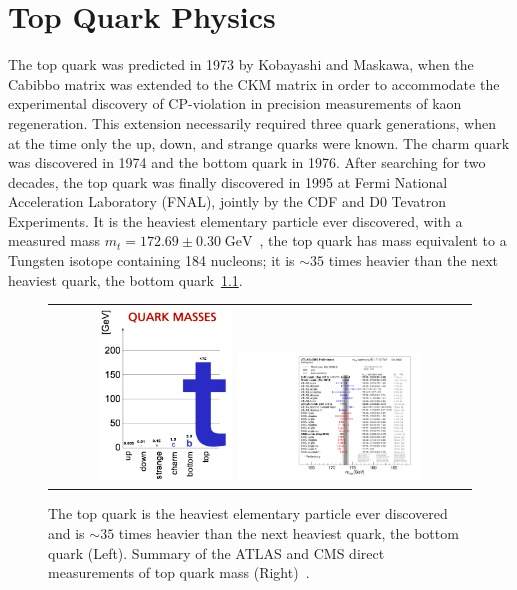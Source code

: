 
\chapter{Top Quark Physics}
The top quark was predicted in 1973 by Kobayashi and Maskawa, when the Cabibbo matrix was extended to the CKM matrix in order to accommodate the experimental discovery of CP-violation in precision measurements of kaon regeneration.
This extension necessarily required three quark generations, when at the time only the up, down, and strange quarks were known.
The charm quark was discovered in 1974 and the bottom quark in 1976.
After searching for two decades, the top quark was finally discovered in 1995 at Fermi National Acceleration Laboratory (FNAL), jointly by the CDF and D0 Tevatron Experiments.
It is the heaviest elementary particle ever discovered, with a measured mass $m_t = 172.69 \pm 0.30 \; \si{\GeV}$~\cite{bib:PDG}, the top quark has mass equivalent to a Tungsten isotope containing 184 nucleons; it is $\sim 35$ times heavier than the next heaviest quark, the bottom quark~\ref{QuarkMasses}.
\begin{figure}[!h]
  \begin{center}
    \begin{tabular}{c}
        \includegraphics[width=0.325\textwidth]{fig_TopQuark/TopQuarkMass.png}
        \includegraphics[width=0.45\textwidth]{fig_TopQuark/LHC_topmass_oct22.pdf}
    \end{tabular}
    \caption{The top quark is the heaviest elementary particle ever discovered and is $\sim 35$ times heavier than the next heaviest quark, the bottom quark (Left).
            Summary of the ATLAS and CMS direct measurements of top quark mass (Right)~\cite{LHCTopWGSummaryPlots}.
            }
    \label{QuarkMasses}
  \end{center}
\end{figure}
